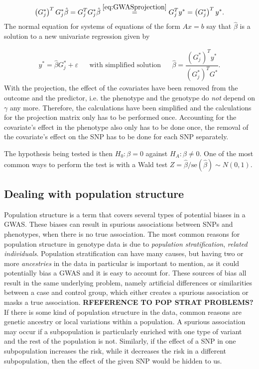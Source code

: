 \begin{equation}
\left( G_j^{\ast} \right)^T G_j^{\ast} \hat{\beta} = G_j^T G_j^{\ast} \hat{\beta} \stackrel{\ref{eq:GWASprojection}}{=} G_j^T y^{\ast} = \left( G_j^{\ast} \right)^T y^{\ast}.
\end{equation}
The normal equation for systems of equations of the form $ Ax=b $ say that $ \hat{\beta} $ is a solution to a new univariate regression given by

\begin{align}\label{eq:univarGWAS}
y^\ast = \hat{\beta} G_j^{\ast} + \varepsilon&   &\text{with simplified solution}&  &\hat{\beta} = \dfrac{\left( G_j^{\ast} \right)^T y^{\ast}}{\left( G_j^{\ast} \right)^T G^{\ast}}.
\end{align}
With the projection, the effect of the covariates have been removed from the outcome and the predictor, i.e. the phenotype and the genotype do \textit{not} depend on $ \gamma $ any more. Therefore, the calculations have been simplified and the calculations for the projection matrix only has to be performed once. Accounting for the covariate's effect in the phenotype also only has to be done once, the removal of the covariate's effect on the SNP has to be done for each SNP separately.

The hypothesis being tested is then $ H_0: \beta = 0 $ against $ H_A: \beta \neq 0 $. One of the most common ways to perform the test is with a Wald test $ Z = \hat{\beta}/\text{se}(\hat{\beta}) \sim N(0,1)$. 

\subsection{Dealing with population structure}
Population structure is a term that covers several types of potential biases in a GWAS. These biases can result in spurious associations between SNPs and phenotypes, when there is no true association. The most common reasons for population structure in genotype data is due to \textit{population stratification}, \textit{related individuals}. Population stratification can have many causes, but having two or more \textit{ancestries} in the data in particular is important to mention, as it could potentially bias a GWAS and it is easy to account for. These sources of bias all result in the same underlying problem, namely artificial differences or similarities between a case and control group, which either creates a spurious association or masks a true association. \textbf{RFEFERENCE TO POP STRAT PROBLEMS?}
If there is some kind of population structure in the data, common reasons are genetic ancestry or local variations within a population. A spurious association may occur if a subpopulation is particularly enriched with one type of variant and the rest of the population is not. Similarly, if the effect of a SNP in one subpopulation increases the risk, while it decreases the risk in a different subpopulation, then the effect of the given SNP would be hidden to us.

